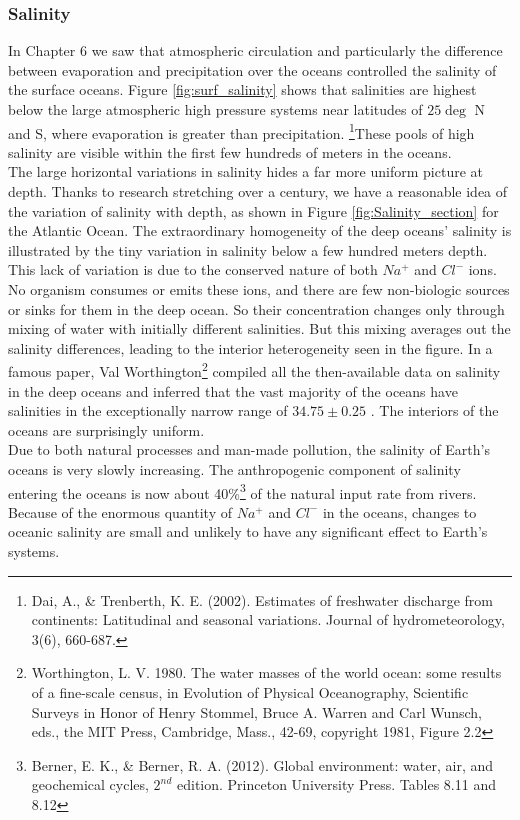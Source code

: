 \documentclass[amstex,12pt]{book}
\begin{document}
\subsubsection{Salinity}
In Chapter 6 we saw that atmospheric circulation and particularly the difference between evaporation and precipitation over the oceans controlled the salinity of the surface oceans. Figure \ref{fig:surf_salinity}
shows that salinities are highest below the large atmospheric high pressure systems near latitudes of $25 \deg$ N and S, where evaporation is greater than precipitation. \footnote{Dai, A., \& Trenberth, K. E. (2002). Estimates of freshwater discharge from continents: Latitudinal and seasonal variations. Journal of hydrometeorology, 3(6), 660-687.}These pools of high salinity are visible within the first few hundreds of meters in the oceans.\\
The large horizontal variations in salinity hides a far more uniform picture at depth. Thanks to research stretching over a century, we have a reasonable idea of the variation of salinity with depth, as shown in Figure \ref{fig:Salinity_section} for the Atlantic Ocean. The extraordinary homogeneity of the deep oceans' salinity is illustrated by the tiny variation in salinity below a few hundred meters depth. This lack of variation is due to the conserved nature of both $Na^+$ and $Cl^-$ ions. No organism consumes or emits these ions, and there are few non-biologic sources or sinks for them in the deep ocean. So their concentration changes only through mixing of water with initially different salinities. But this mixing averages out the salinity differences, leading to the interior heterogeneity seen in the figure. In a famous paper, Val Worthington\footnote{Worthington, L. V. 1980. The water masses of the world ocean: some results of a fine-scale census, in Evolution of Physical Oceanography, Scientific Surveys in Honor of Henry Stommel, Bruce A. Warren and Carl Wunsch, eds., the MIT Press, Cambridge, Mass., 42-69, copyright 1981, Figure 2.2} compiled all the then-available data on salinity in the deep oceans and inferred that the vast majority of the oceans have salinities in the exceptionally narrow range of $34.75\pm 0.25$ \textperthousand. The interiors of the oceans are surprisingly uniform.\\ 
Due to both natural processes and man-made pollution, the salinity of Earth's oceans is very slowly increasing. The anthropogenic component of salinity entering the oceans is now about 40\%\footnote{Berner, E. K., \& Berner, R. A. (2012). Global environment: water, air, and geochemical cycles, $2^{nd}$ edition. Princeton University Press. Tables 8.11 and 8.12} of the natural input rate from rivers. Because of the enormous quantity of $Na^+$ and $Cl^-$ in the oceans, changes to oceanic salinity are small and unlikely to have any significant effect to Earth's systems. 
\end{document}
